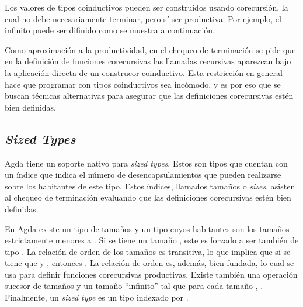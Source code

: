 Los valores de tipos coinductivos pueden ser construidos usando corecursión, la cual no debe necesariamente terminar, pero sí ser productiva. Por ejemplo, el infinito puede ser difinido como se muestra a continuación.


Como aproximación a la productividad, en el chequeo de terminación se pide que en la definición de funciones corecursivas las llamadas recursivas aparezcan bajo la aplicación directa de un construcor coinductivo. Esta restricción en general hace que programar con tipos coinductivos sea incómodo, y es por eso que se buscan técnicas alternativas para asegurar que las definiciones corecursivas estén bien definidas. 

\subsection{\textit{Sized Types}}\label{coind:agda:sized}

Agda tiene un soporte nativo para \textit{sized types}. Estos son tipos que cuentan con un índice que indica el número de desencapsulamientos que pueden realizarse sobre los habitantes de este tipo. Estos índices, llamados tamaños o \textit{sizes}, asisten al chequeo de terminación evaluando que las definiciones corecursivas estén bien definidas. 

En Agda existe un tipo  de tamaños y un tipo   cuyos habitantes son los tamaños estrictamente menores a . Si se tiene un tamaño  \AgdaSymbol{:}  , este es forzado a ser también de tipo . La relación de orden de los tamaños es transitiva, lo que implica que si se tiene que  \AgdaSymbol{:}   y  \AgdaSymbol{:}  , entonces  \AgdaSymbol{:}  . La relación de orden es, además, bien fundada, lo cual se usa para definir funciones corecursivas productivas. Existe también una operación sucesor de tamaños \AgdaFunction{$\uparrow$} y un tamaño ``infinito'' \AgdaArgument{$\infty$} tal que para cada tamaño ,  \AgdaSymbol{:}  \AgdaArgument{$\infty$}. Finalmente, un \textit{sized type} es un tipo indexado por .

